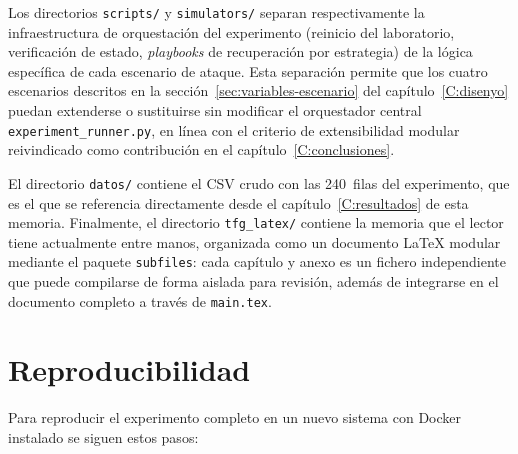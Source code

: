 \documentclass[../main.tex]{subfiles}
\begin{document}
Los directorios \texttt{scripts/} y \texttt{simulators/} separan
respectivamente la infraestructura de orquestación del experimento (reinicio del
laboratorio, verificación de estado, \emph{playbooks} de recuperación por
estrategia) de la lógica específica de cada escenario de ataque. Esta separación
permite que los cuatro escenarios descritos en la
sección~\ref{sec:variables-escenario} del capítulo~\ref{C:disenyo} puedan
extenderse o sustituirse sin modificar el orquestador central
\texttt{experiment\_runner.py}, en línea con el criterio de extensibilidad
modular reivindicado como contribución en el
capítulo~\ref{C:conclusiones}.

El directorio \texttt{datos/} contiene el CSV crudo con las 240~filas del
experimento, que es el que se referencia directamente desde el
capítulo~\ref{C:resultados} de esta memoria. Finalmente, el directorio
\texttt{tfg\_latex/} contiene la memoria que el lector tiene actualmente
entre manos, organizada como un documento LaTeX modular mediante el paquete
\texttt{subfiles}: cada capítulo y anexo es un fichero independiente que puede
compilarse de forma aislada para revisión, además de integrarse en el documento
completo a través de \texttt{main.tex}.

\section{Reproducibilidad}

Para reproducir el experimento completo en un nuevo sistema con Docker
instalado se siguen estos pasos:
\end{document}
